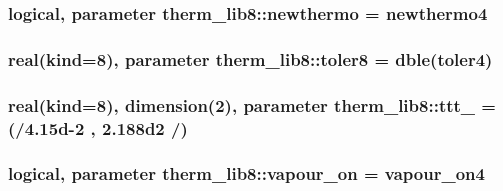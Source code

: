 \subsubsection[{newthermo}]{\setlength{\rightskip}{0pt plus 5cm}logical, parameter therm\+\_\+lib8\+::newthermo = newthermo4}\label{namespacetherm__lib8_acf7c73667b035fd1eb6ab1d3924e941e}
\hypertarget{namespacetherm__lib8_a8b637ec830ea211fe50a2365a9a5d1e2}{}
\subsubsection[{toler8}]{\setlength{\rightskip}{0pt plus 5cm}real(kind=8), parameter therm\+\_\+lib8\+::toler8 = dble(toler4)}\label{namespacetherm__lib8_a8b637ec830ea211fe50a2365a9a5d1e2}
\hypertarget{namespacetherm__lib8_a5879d4524f2706a75384614d311d91c7}{}
\subsubsection[{ttt\+\_\+108}]{\setlength{\rightskip}{0pt plus 5cm}real(kind=8), dimension(2), parameter therm\+\_\+lib8\+::ttt\+\_ = (/4.\+15d-\/2 , 2.\+188d2 /)}\label{namespacetherm__lib8_a5879d4524f2706a75384614d311d91c7}
\hypertarget{namespacetherm__lib8_a8dcf3ae8ee8dc104aaded77571f2be33}{}
\subsubsection[{vapour\+\_\+on}]{\setlength{\rightskip}{0pt plus 5cm}logical, parameter therm\+\_\+lib8\+::vapour\+\_\+on = vapour\+\_\+on4}\label{namespacetherm__lib8_a8dcf3ae8ee8dc104aaded77571f2be33}

